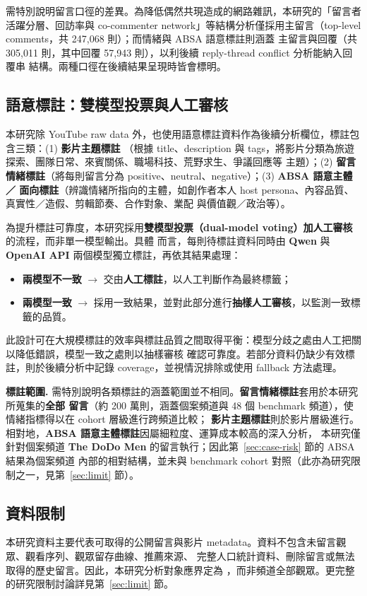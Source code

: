 需特別說明留言口徑的差異。為降低偶然共現造成的網路雜訊，本研究的「留言者活躍分層、回訪率與 co-commenter
network」等結構分析僅採用主留言（top-level comments，共 247{,}068 則）；而情緒與 ABSA 語意標註則涵蓋
主留言與回覆（共 305{,}011 則，其中回覆 57{,}943 則），以利後續 reply-thread conflict 分析能納入回覆串
結構。兩種口徑在後續結果呈現時皆會標明。

\subsection{語意標註：雙模型投票與人工審核}
\label{sec:data-label}

本研究除 YouTube raw data 外，也使用語意標註資料作為後續分析欄位，標註包含三類：(1) \textbf{影片主題標註}
（根據 title、description 與 tags，將影片分類為旅遊探索、團隊日常、來賓關係、職場科技、荒野求生、爭議回應等
主題）；(2) \textbf{留言情緒標註}（將每則留言分為 positive、neutral、negative）；(3) \textbf{ABSA 語意主體／
面向標註}（辨識情緒所指向的主體，如創作者本人 host persona、內容品質、真實性／造假、剪輯節奏、合作對象、業配
與價值觀／政治等）。

為提升標註可靠度，本研究採用\textbf{雙模型投票（dual-model voting）加人工審核}的流程，而非單一模型輸出。具體
而言，每則待標註資料同時由 \textbf{Qwen} 與 \textbf{OpenAI API} 兩個模型獨立標註，再依其結果處理：

\begin{itemize}
  \item \textbf{兩模型不一致} $\to$ 交由\textbf{人工標註}，以人工判斷作為最終標籤；
  \item \textbf{兩模型一致} $\to$ 採用一致結果，並對此部分進行\textbf{抽樣人工審核}，以監測一致標籤的品質。
\end{itemize}

此設計可在大規模標註的效率與標註品質之間取得平衡：模型分歧之處由人工把關以降低錯誤，模型一致之處則以抽樣審核
確認可靠度。若部分資料仍缺少有效標註，則於後續分析中記錄 coverage，並視情況排除或使用 fallback 方法處理。

\textbf{標註範圍.} 需特別說明各類標註的涵蓋範圍並不相同。\textbf{留言情緒標註}套用於本研究所蒐集的\textbf{全部
留言}（約 200 萬則，涵蓋個案頻道與 48 個 benchmark 頻道），使情緒指標得以在 cohort 層級進行跨頻道比較；
\textbf{影片主題標註}則於影片層級進行。相對地，\textbf{ABSA 語意主體標註}因屬細粒度、運算成本較高的深入分析，
本研究僅針對個案頻道 \textbf{The DoDo Men} 的留言執行；因此第~\ref{sec:case-risk} 節的 ABSA 結果為個案頻道
內部的相對結構，並未與 benchmark cohort 對照（此亦為研究限制之一，見第~\ref{sec:limit} 節）。

\subsection{資料限制}
\label{sec:data-limit}

本研究資料主要代表可取得的公開留言與影片 metadata。資料不包含未留言觀眾、觀看序列、觀眾留存曲線、推薦來源、
完整人口統計資料、刪除留言或無法取得的歷史留言。因此，本研究分析對象應界定為 ，而非頻道全部觀眾。更完整的研究限制討論詳見第~\ref{sec:limit} 節。
